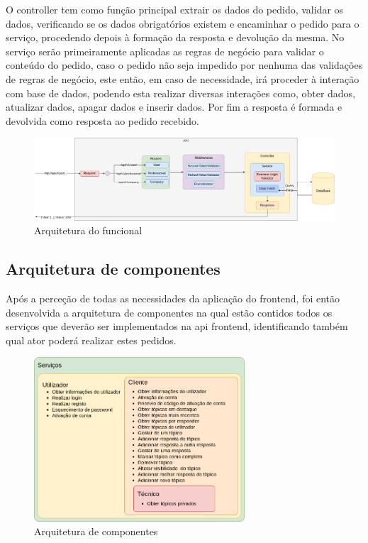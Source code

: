 O controller tem como função principal extrair os dados do pedido, validar os dados, verificando 
se os dados obrigatórios existem e encaminhar o pedido para o serviço, procedendo depois à formação 
da resposta e devolução da mesma. No serviço serão primeiramente aplicadas as regras de negócio para 
validar o conteúdo do pedido, caso o pedido não seja impedido por nenhuma das validações de 
regras de negócio, este então, em caso de necessidade, irá proceder à interação com base de dados, 
podendo esta realizar diversas interações como, obter dados, atualizar dados, apagar dados e inserir 
dados. Por fim a resposta é formada e devolvida como resposta ao pedido recebido.

\begin{figure}[htb]
    \centering
    \includegraphics[width=\textwidth]{images/Arquiteturas/arquitetura_funcional.png}
    \caption{Arquitetura do funcional}
    \label{fig:47}
\end{figure}

\newpage

\subsection{Arquitetura de componentes}
Após a perceção de todas as necessidades da aplicação do frontend, foi então desenvolvida a 
arquitetura de componentes na qual estão contidos todos os serviços que deverão ser implementados na 
api frontend, identificando também qual ator poderá realizar estes pedidos.

\begin{figure}[htb]
    \centering
    \includegraphics[width=0.7\textwidth]{images/Arquiteturas/arquitetura_de_componentes_final.png}
    \caption{Arquitetura de componentes}
    \label{fig:48}
\end{figure}

